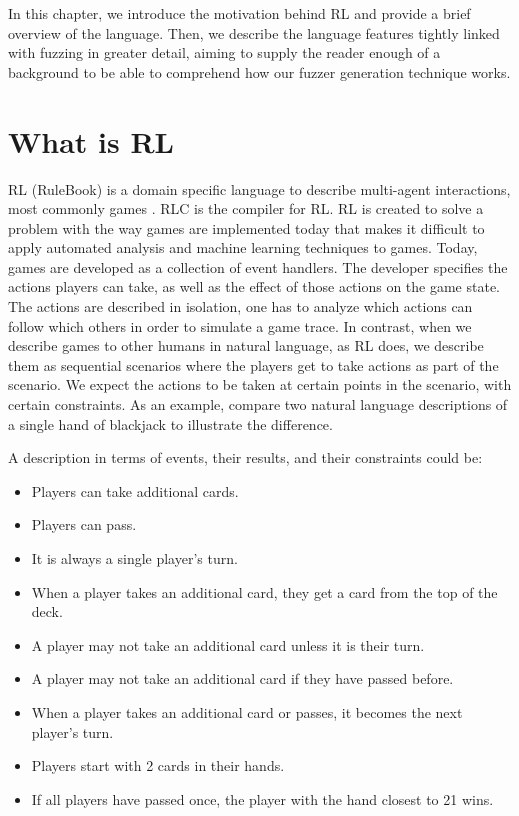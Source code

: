 In this chapter, we introduce the motivation behind RL and provide a brief overview of the language.
Then, we describe the language features tightly linked with fuzzing in greater detail, aiming to supply the reader enough of a background to 
be able to comprehend how our fuzzer generation technique works.

\section{What is RL}
RL (RuleBook) is a domain specific language to describe multi-agent interactions, most commonly games \cite{RLC}.
RLC is the compiler for RL. RL is created to solve a problem with the way games are implemented today that makes it difficult to apply automated analysis and machine learning techniques to games.
Today, games are developed as a collection of event handlers.
The developer specifies the actions players can take, as well as the effect of those actions on the game state.
The actions are described in isolation, one has to analyze which actions can follow which others in order to simulate a game trace.
In contrast, when we describe games to other humans in natural language, as RL does, we describe them as sequential scenarios where the players get to take actions as part of the scenario.
We expect the actions to be taken at certain points in the scenario, with certain constraints.
As an example, compare two natural language descriptions of a single hand of blackjack to illustrate the difference.

A description in terms of events, their results, and their constraints could be:
\begin{itemize}
    \item Players can take additional cards.
    \item Players can pass.
    \item It is always a single player’s turn.
    \item When a player takes an additional card, they get a card from the top of the deck.
    \item A player may not take an additional card unless it is their turn.
    \item A player may not take an additional card if they have passed before.
    \item When a player takes an additional card or passes, it becomes the next player’s turn.
    \item Players start with 2 cards in their hands.
    \item If all players have passed once, the player with the hand closest to 21 wins.
\end{itemize}

